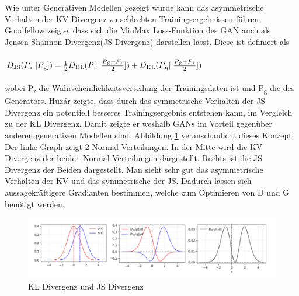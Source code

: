 \documentclass{llncs}
\begin{document}
Wie unter Generativen Modellen gezeigt wurde kann das asymmetrische Verhalten der KV Divergenz zu schlechten Trainingsergebnissen führen. Goodfellow \cite{goodfellow2014} zeigte, dass sich die MinMax Loss-Funktion des GAN auch als Jensen-Shannon Divergenz(JS Divergenz) darstellen lässt. Diese ist definiert als
\\\\
\begin{math} D\textsubscript{JS}(P\textsubscript{r}|| P\textsubscript{g}])=\frac{1}{2}D\textsubscript{KL}(P\textsubscript{r}|| \frac{P\textsubscript{g}+P\textsubscript{r}}{2}])+D\textsubscript{KL}(P\textsubscript{q}|| \frac{P\textsubscript{g}+P\textsubscript{r}}{2}])  
\end{math}
\\\\
wobei P\textsubscript{r} die Wahrscheinlichkeitsverteilung der Trainingsdaten ist und P\textsubscript{g} die des Generators. Huzár \cite{sha} zeigte, dass durch das symmetrische Verhalten der JS Divergenz ein potentiell besseres Trainingsergebnis entstehen kann, im Vergleich zu der KL Divergenz. Damit zeigte er weshalb GANs im Vorteil gegenüber anderen generativen Modellen sind. Abbildung \ref{fig:Bild21} veranschaulicht dieses Konzept. Der linke Graph zeigt 2 Normal Verteilungen. In der Mitte wird die KV Divergenz der beiden Normal Verteilungen dargestellt.  Rechts ist die JS Divergenz der Beiden dargestellt. Man sieht sehr gut das asymmetrische Verhalten der KV und das symmetrische der JS. Dadurch lassen sich aussagekräftigere Gradianten bestimmen, welche zum Optimieren von D und G benötigt werden\cite{sha}. 

\begin{figure}
	\centering
	\includegraphics[width=1.0\linewidth]{KLdiv}
	\caption{KL Divergenz und JS Divergenz}
	\label{fig:Bild21}
\end{figure}
\end{document}
